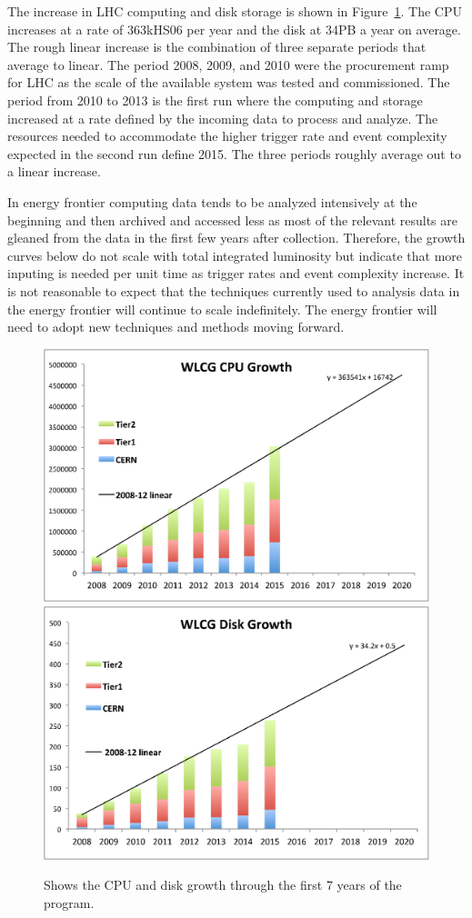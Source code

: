 The increase in LHC computing and disk storage is shown in
Figure~\ref{fig:growth}.  The CPU increases at a rate of 363kHS06 per
year and the disk at 34PB a year on average.  The rough linear
increase is the combination of three separate periods that average to
linear.  The period 2008, 2009, and 2010 were the procurement ramp for
LHC as the scale of the available system was tested and commissioned.
The period from 2010 to 2013 is the first run where the computing and
storage increased at a rate defined by the incoming data to process
and analyze.  The resources needed to accommodate the higher trigger
rate and event complexity expected in the second run define 2015.  The
three periods roughly average out to a linear increase.

In energy frontier computing data tends to be analyzed intensively at
the beginning and then archived and accessed less as most of the
relevant results are gleaned from the data in the first few years
after collection.  Therefore, the growth curves below do not scale
with total integrated luminosity but indicate that more inputing is
needed per unit time as trigger rates and event complexity increase.
It is not reasonable to expect that the techniques currently used to
analysis data in the energy frontier will continue to scale
indefinitely.  The energy frontier will need to adopt new techniques
and methods moving forward.

\begin{figure}[htb]
\begin{center}
\includegraphics[width=0.45\hsize]{CpF-E2/Growth1.eps}
\includegraphics[width=0.45\hsize]{CpF-E2/Growth2.eps}
\caption{Shows the CPU and disk growth through the first 7 years of the program.}
\label{fig:growth}
\end{center}
\end{figure}



